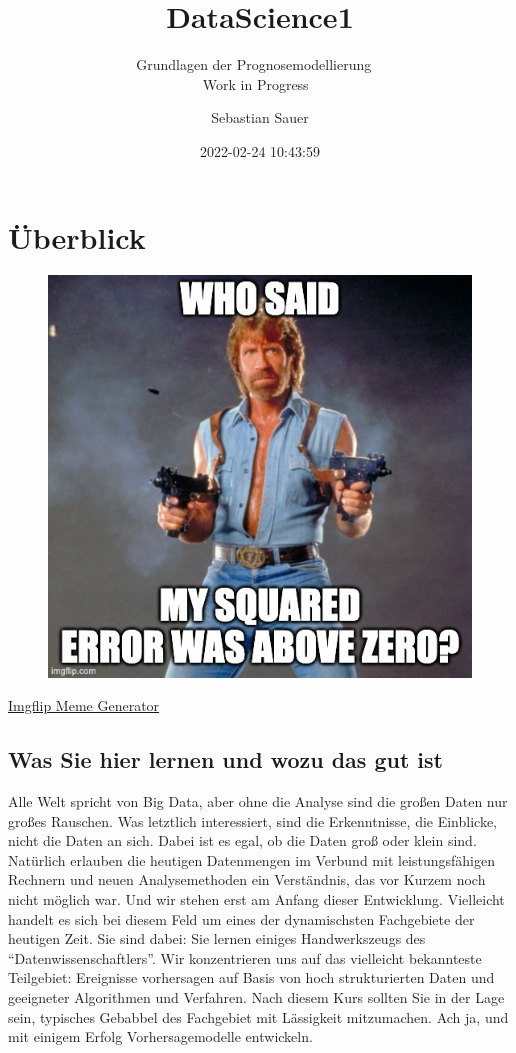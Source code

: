 \documentclass[
]{book}
\title{DataScience1}
\subtitle{Grundlagen der Prognosemodellierung 🔮🧰\\
Work in Progress 🚧}
\author{Sebastian Sauer}
\date{2022-02-24 10:43:59}
\begin{document}
\maketitle

{
\setcounter{tocdepth}{1}
\tableofcontents
}
\hypertarget{uxfcberblick}{%
\chapter{Überblick}\label{uxfcberblick}}

\begin{figure}[H]

{\centering \includegraphics[width=0.5\linewidth]{img/662upp} 

}

\end{figure}

\href{https://imgflip.com/i/662upp}{Imgflip Meme Generator}

\hypertarget{was-sie-hier-lernen-und-wozu-das-gut-ist}{%
\section{Was Sie hier lernen und wozu das gut ist}\label{was-sie-hier-lernen-und-wozu-das-gut-ist}}

Alle Welt spricht von Big Data, aber ohne die Analyse sind die großen Daten nur großes Rauschen. Was letztlich interessiert, sind die Erkenntnisse, die Einblicke, nicht die Daten an sich.
Dabei ist es egal, ob die Daten groß oder klein sind.
Natürlich erlauben die heutigen Datenmengen im Verbund mit leistungsfähigen Rechnern und neuen Analysemethoden ein Verständnis,
das vor Kurzem noch nicht möglich war.
Und wir stehen erst am Anfang dieser Entwicklung.
Vielleicht handelt es sich bei diesem Feld um eines der dynamischsten Fachgebiete der heutigen Zeit.
Sie sind dabei: Sie lernen einiges Handwerkszeugs des ``Datenwissenschaftlers''.
Wir konzentrieren uns auf das vielleicht bekannteste Teilgebiet:
Ereignisse vorhersagen auf Basis von hoch strukturierten Daten
und geeigneter Algorithmen und Verfahren.
Nach diesem Kurs sollten Sie in der Lage sein,
typisches Gebabbel des Fachgebiet mit Lässigkeit mitzumachen.
Ach ja, und mit einigem Erfolg Vorhersagemodelle entwickeln.
\end{document}
